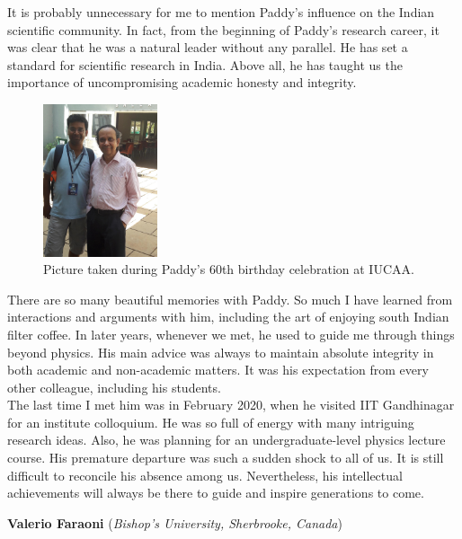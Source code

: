 \documentclass[prd, preprint, longbibliography, 11pt]{revtex4-1}
\begin{document}
It is probably unnecessary for me to mention Paddy's influence on the Indian scientific community. In fact, from the beginning of Paddy's research career, it was clear that he was a natural leader without any parallel. He has set a standard for scientific research in India. Above all, he has taught us the importance of uncompromising academic honesty and integrity.


\begin{figure}[H]
\centering
\includegraphics[width=0.3\textwidth]{with_paddy.jpeg}
\caption* {Picture taken during Paddy's 60th birthday celebration at IUCAA.}
\end{figure}


There are so many beautiful memories with Paddy. So much I have learned from interactions and arguments with him, including the art of enjoying south Indian filter coffee. In later years, whenever we met, he used to guide me through things beyond physics. His main advice was always to maintain absolute integrity in both academic and non-academic matters. It was his expectation from every other colleague, including his students. \\

The last time I met him was in February 2020, when he visited IIT Gandhinagar for an institute colloquium. He was so full of energy with many intriguing research ideas. Also, he was planning for an undergraduate-level physics lecture course. His premature departure was such a sudden shock to all of us. It is still difficult to reconcile his absence among us. Nevertheless, his intellectual achievements will always be there to guide and inspire generations to come.




\bigskip

\bigskip


\centerline{{\bf Valerio Faraoni} ({\it Bishop's University, Sherbrooke, Canada})}
\medskip
\noindent 
\end{document}
